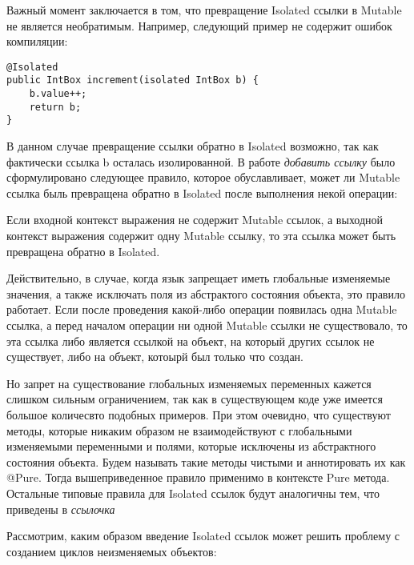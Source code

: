Важный момент заключается в том, что превращение Isolated ссылки в Mutable не является необратимым. Например, следующий пример не содержит ошибок компиляции:

\begin{lstlisting}[caption=Превращение Isolated ссылки в Mutable и обратно, label=code:isolated_to_mutable_and_back]
@Isolated
public IntBox increment(isolated IntBox b) { 
    b.value++; 
    return b;
}
\end{lstlisting}

В данном случае превращение ссылки обратно в Isolated возможно, так как фактически ссылка b осталась изолированной. В работе \textit{добавить ссылку} было сформулировано следующее правило, которое обуславливает, может ли Mutable ссылка быль превращена обратно в Isolated после выполнения некой операции:

\begin{Rule}\label{rule:convert_isolated}
Если входной контекст выражения не содержит Mutable ссылок, а выходной контекст выражения содержит одну Mutable ссылку, то эта ссылка может быть превращена обратно в Isolated.
\end{Rule}

Действительно, в случае, когда язык запрещает иметь глобальные изменяемые значения, а также исключать поля из абстрактого состояния объекта, это правило работает. Если после проведения какой-либо операции появилась одна Mutable ссылка, а перед началом операции ни одной Mutable ссылки не существовало, то эта ссылка либо является ссылкой на объект, на который других ссылок не существует, либо на объект, котоырй был только что создан. 

Но запрет на существование глобальных изменяемых переменных кажется слишком сильным ограничением, так как в существующем коде уже имеется большое количесвто подобных примеров. При этом очевидно, что существуют методы, которые никаким образом не взаимодействуют с глобальными изменяемыми переменными и полями, которые исключены из абстрактного состояния объекта. Будем называть такие методы чистыми и аннотировать их как @Pure. Тогда вышеприведенное правило применимо в контексте Pure метода. Остальные типовые правила для Isolated ссылок будут аналогичны тем, что приведены в \textit{ссылочка} 

Рассмотрим, каким образом введение Isolated ссылок может решить проблему с созданием циклов неизменяемых объектов:

